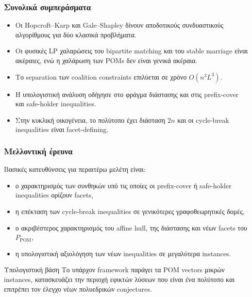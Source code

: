 \documentclass{beamer}
\begin{document}
	
	\begin{frame}
		\frametitle{Συνολικά συμπεράσματα}
		
		\begin{itemize}
			\item Οι Hopcroft--Karp και Gale--Shapley δίνουν αποδοτικούς συνδυαστικούς αλγορίθμους για δύο κλασικά προβλήματα.
			\item Οι φυσικές LP χαλαρώσεις του bipartite matching και του stable marriage είναι ακέραιες, ενώ η χαλάρωση των POMs δεν είναι γενικά ακέραια.
			\item Το separation των coalition constraints επιλύεται σε χρόνο $O(n^3L^3)$.
			\item Η υπολογιστική ανάλυση οδήγησε στο φράγμα διάστασης και στις prefix-cover και safe-holder inequalities.
			\item Στην κυκλική οικογένεια, το πολύτοπο έχει διάσταση $2n$ και οι cycle-break inequalities είναι facet-defining.
		\end{itemize}
		
	\end{frame}
	
	\begin{frame}
		\frametitle{Μελλοντική έρευνα}
		
		Βασικές κατευθύνσεις για περαιτέρω μελέτη είναι:
		
		\begin{itemize}
			\item ο χαρακτηρισμός των συνθηκών υπό τις οποίες οι prefix-cover ή safe-holder inequalities ορίζουν facets,
			\item η επέκταση των cycle-break inequalities σε γενικότερες γραφοθεωρητικές δομές,
			\item ο ακριβέστερος χαρακτηρισμός του affine hull, της διάστασης και νέων facets του $P_{\mathrm{POM}}$,
			\item η υπολογιστική αξιολόγηση των νέων inequalities σε μεγαλύτερα instances.
		\end{itemize}
		
		\begin{block}{Υπολογιστική βάση}
			Το υπάρχον framework παράγει τα POM vectors μικρών instances, κατασκευάζει την περιοχή εφικτών λύσεων που είναι ένα πολύτοπο και επιτρέπει τον έλεγχο νέων πολυεδρικών conjectures.
		\end{block}
	\end{frame}
	
\end{document}
